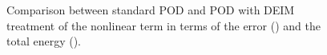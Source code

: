 \begin{figure}[h!]
\begin{subfigure}[]{0.47\linewidth}
\caption{}
\label{energy_DEIM}
\end{subfigure}
\caption{Comparison between standard POD and POD with DEIM treatment of the nonlinear term in terms of the error (\protect{}) and the total energy (\protect{}).}
\label{fig:RIC2}
\end{figure}


